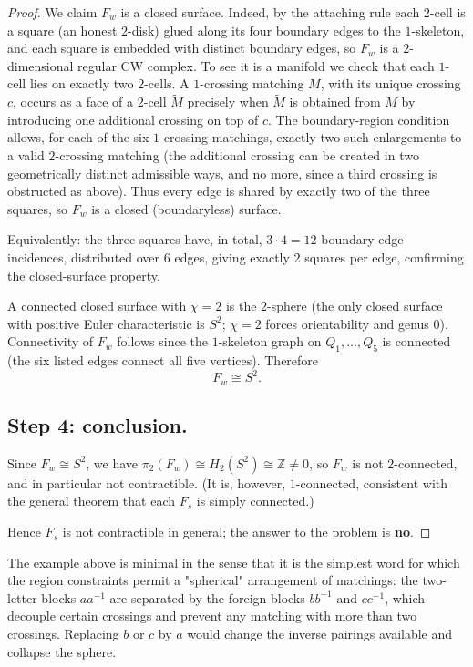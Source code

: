 \begin{proof}
We claim $F_w$ is a closed surface. Indeed, by the attaching rule each $2$-cell
is a square (an honest $2$-disk) glued along its four boundary edges to the
$1$-skeleton, and each square is embedded with distinct boundary edges, so
$F_w$ is a $2$-dimensional regular CW complex. To see it is a manifold we check
that each $1$-cell lies on exactly two $2$-cells. A $1$-crossing matching $M$,
with its unique crossing $c$, occurs as a face of a $2$-cell $\widetilde M$
precisely when $\widetilde M$ is obtained from $M$ by introducing one
additional crossing on top of $c$. The boundary-region condition allows, for
each of the six $1$-crossing matchings, exactly two such enlargements to a
valid $2$-crossing matching (the additional crossing can be created in two
geometrically distinct admissible ways, and no more, since a third crossing is
obstructed as above). Thus every edge is shared by exactly two of the three
squares, so $F_w$ is a closed (boundaryless) surface.

Equivalently: the three squares have, in total, $3\cdot 4=12$ boundary-edge
incidences, distributed over $6$ edges, giving exactly $2$ squares per edge,
confirming the closed-surface property.

A connected closed surface with $\chi=2$ is the $2$-sphere
(the only closed surface with positive Euler characteristic is $S^2$;
$\chi=2$ forces orientability and genus $0$). Connectivity of $F_w$ follows
since the $1$-skeleton graph on $Q_1,\dots,Q_5$ is connected (the six listed
edges connect all five vertices). Therefore
\[
  F_w\cong S^2.
\]

\subsection*{Step 4: conclusion.}
Since $F_w\cong S^2$, we have $\pi_2(F_w)\cong H_2(S^2)\cong\mathbb Z\neq 0$,
so $F_w$ is not $2$-connected, and in particular not contractible. (It is,
however, $1$-connected, consistent with the general theorem that each $F_s$ is
simply connected.)

Hence $F_s$ is not contractible in general; the answer to the problem is
\textbf{no}.
\end{proof}

\begin{remark}
The example above is minimal in the sense that it is the simplest word for
which the region constraints permit a "spherical" arrangement of matchings:
the two-letter blocks $aa^{-1}$ are separated by the foreign blocks $bb^{-1}$
and $cc^{-1}$, which decouple certain crossings and prevent any matching with
more than two crossings. Replacing $b$ or $c$ by $a$ would change the inverse
pairings available and collapse the sphere.
\end{remark}